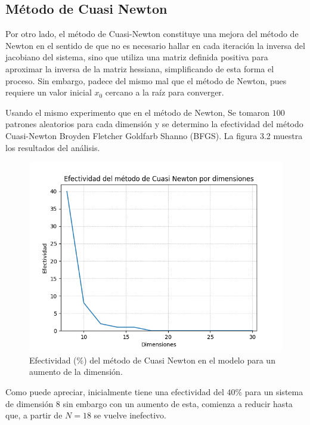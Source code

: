 \subsection{M\'etodo de Cuasi Newton}

\par Por otro lado, el m\'etodo de Cuasi-Newton constituye una mejora del m\'etodo de Newton en el sentido de que no es necesario hallar en cada iteraci\'on la inversa del jacobiano del sistema, sino que utiliza una matriz definida positiva para aproximar la inversa de la matriz hessiana, simplificando de esta forma el proceso. Sin embargo, padece del mismo mal que el m\'etodo de Newton, pues requiere un valor inicial $x_0$ cercano a la ra\'iz para converger.

\par Usando el mismo experimento que en el m\'etodo de Newton, Se tomaron $100$ patrones aleatorios para cada dimensi\'on y se determino la efectividad del m\'etodo Cuasi-Newton Broyden Fletcher Goldfarb Shanno (BFGS). La figura 3.2 muestra los resultados del an\'alisis.\\

\begin{figure}[h]
\center
\includegraphics[scale=.4]{Graphics/CuasiNewton.png}
\caption{Efectividad (\%) del m\'etodo de Cuasi Newton en el modelo para un aumento de la dimensi\'on.}
\end{figure}

\par Como puede apreciar, inicialmente tiene una efectividad del $40\%$ para un sistema de dimensi\'on $8$ sin embargo con un aumento de esta, comienza a reducir hasta que, a partir de $N=18$ se vuelve inefectivo.

